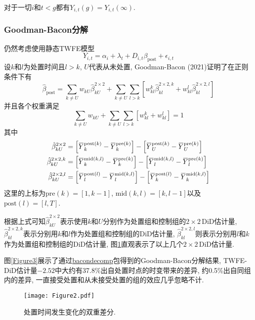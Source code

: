 \documentclass[cn,blue,14pt,screen,bibstyle=gb7714-2015]{elegantnote}
\newcommand{\overbar}[1]{\mkern 1.5mu\overline{\mkern-1.5mu#1\mkern-1.5mu}\mkern 1.5mu}
\begin{document}
\begin{definition}[无参与效应]
对于一切$i$和$t<g$都有$Y_{i,t}(g)=Y_{i,t}(\infty)$.
\end{definition}

\subsubsection{Goodman-Bacon分解}
仍然考虑使用静态TWFE模型
$$Y_{i,t}=\alpha_i+\lambda_t+D_{i,t}\beta_\text{post}+\epsilon_{i,t}$$
设$k$和$l$为处置时间且$l>k$, $U$代表从未处置, Goodman-Bacon (2021)证明了在正则条件下有
$$\hat{\beta}_\text{post}=\sum_{k\ne U}w_{kU}\hat{\beta}_{kU}^{2\times 2}+\sum_{k\ne U}\sum_{l>k}\left[w_{kl}^k\hat{\beta}_{kl}^{2\times 2, k}+w_{kl}^l\hat{\beta}_{kl}^{2\times2,l}\right]$$
并且各个权重满足
$$\sum_{k\ne U}w_{kU}+\sum_{k\ne U}\sum_{l>k}\left[w_{kl}^k+w_{kl}^l\right]=1$$
其中
\begin{align*}
\hat{\beta}_{kU}^{2\times2}&=\left[\overbar{Y}_k^{\text{post}(k)}-\overbar{Y}_k^{\text{pre}(k)}\right]-\left[\overbar{Y}_U^{\text{post}(k)}-\overbar{Y}_U^{\text{pre}(k)}\right] \\
\hat{\beta}_{kU}^{2\times2, k}&=\left[\overbar{Y}_k^{\text{mid}(k,l)}-\overbar{Y}_k^{\text{pre}(k)}\right]-\left[\overbar{Y}_l^{\text{mid}(k,l)}-\overbar{Y}_l^{\text{pre}(k)}\right] \\
\hat{\beta}_{kU}^{2\times2, l}&=\left[\overbar{Y}_l^{\text{post}(l)}-\overbar{Y}_l^{\text{mid}(k,l)}\right]-\left[\overbar{Y}_k^{\text{post}(l)}-\overbar{Y}_k^{\text{mid}(k,l)}\right]
\end{align*}
这里的上标为$\text{pre}(k)=[1,k-1]$, $\text{mid}(k,l)=[k,l-1]$以及$\text{post}(l)=[l,T]$.

根据上式可知$\hat{\beta}^{2\times2}_{kU}$表示使用$k$和$U$分别作为处置组和控制组的$2\times2\,$DiD估计量, $\hat{\beta}_{kl}^{2\times2,k}$表示分别用$k$和$l$作为处置组和控制组的DiD估计量, $\hat{\beta}_{kl}^{2\times2, l}$则表示分别用$l$和$k$作为处置组和控制组的DiD估计量, 图\ref{Figure2}直观表示了以上几个$2\times 2\,$DiD估计量. 

图\ref{Figure3}展示了通过\href{https://asjadnaqvi.github.io/DiD/docs/code/06_bacon/}{bacondecomp}包得到的Goodman-Bacon分解结果, TWFE-DiD估计量$-2.52$中大约有37.8\%出自处置时点的时变带来的差异, 约0.5\%出自同组内的差异, 一直接受处置和从未接受处置的组的效应几乎忽略不计.

\begin{figure}
  \centering
  \texttt{[image: Figure2.pdf]}
  \caption{处置时间发生变化的双重差分.}\label{Figure2}
\end{figure}
\end{document}
